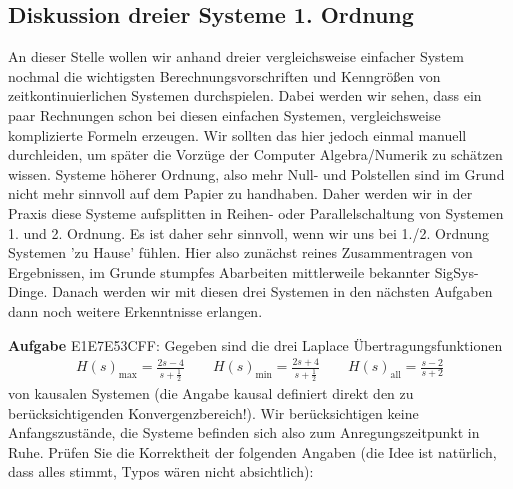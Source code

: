 \newpage
\subsection{Diskussion dreier Systeme 1. Ordnung}
\label{sec:E1E7E53CFF}
\begin{Ziel}
An dieser Stelle wollen wir anhand dreier vergleichsweise einfacher System
nochmal die wichtigsten Berechnungsvorschriften und Kenngrößen von
zeitkontinuierlichen Systemen durchspielen.
Dabei werden wir sehen, dass ein paar Rechnungen schon bei diesen einfachen
Systemen, vergleichsweise komplizierte Formeln erzeugen.
Wir sollten das hier jedoch einmal manuell durchleiden, um später die Vorzüge der
Computer Algebra/Numerik zu schätzen wissen. Systeme höherer Ordnung, also mehr Null-
und Polstellen sind im Grund nicht mehr sinnvoll auf dem Papier zu handhaben.
Daher werden wir in der Praxis diese Systeme aufsplitten in Reihen- oder
Parallelschaltung von Systemen 1. und 2. Ordnung. Es ist daher sehr sinnvoll,
wenn wir uns bei 1./2. Ordnung Systemen 'zu Hause' fühlen.
Hier also zunächst reines Zusammentragen von Ergebnissen, im Grunde stumpfes
Abarbeiten mittlerweile bekannter SigSys-Dinge. Danach werden wir mit diesen
drei Systemen in den nächsten Aufgaben dann noch weitere Erkenntnisse
erlangen.
\end{Ziel}
\textbf{Aufgabe} {\tiny E1E7E53CFF}: Gegeben sind die drei Laplace
Übertragungsfunktionen
\begin{align}
H(s)_\mathrm{max} = \frac{2 s-4}{s+\frac{1}{2}}\qquad
H(s)_\mathrm{min} = \frac{2 s+4}{s+\frac{1}{2}}\qquad
H(s)_\mathrm{all} = \frac{s-2}{s+2}
\end{align}
von kausalen Systemen (die Angabe kausal definiert direkt den zu berücksichtigenden
Konvergenzbereich!).
Wir berücksichtigen keine Anfangszustände, die Systeme
befinden sich also zum Anregungszeitpunkt in Ruhe.
%
Prüfen Sie die Korrektheit der folgenden Angaben (die Idee ist natürlich,
dass alles stimmt, Typos wären nicht absichtlich):
